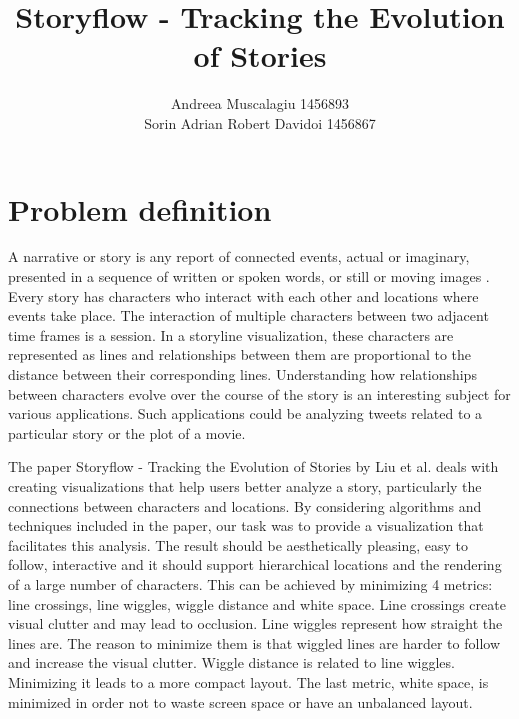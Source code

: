 \documentclass{report}
\begin{document}
\title{Storyflow - Tracking the Evolution of Stories}
\author{Andreea Muscalagiu 1456893\\
Sorin Adrian Robert Davidoi		1456867}
\maketitle
\chapter{Problem definition}
\par
A narrative or story is any report of connected events, actual or imaginary, presented in a sequence of written or spoken words, or still or moving images \cite{Narrative}. Every story has characters who interact with each other and locations where events take place. The interaction of multiple characters between two adjacent time frames is a session. In a storyline visualization, these characters are represented as lines and relationships between them are proportional to the distance between their corresponding lines. Understanding how relationships between characters evolve over the course of the story is an interesting subject for various applications. Such applications could be analyzing tweets related to a particular story or the plot of a movie.

\par The paper Storyflow - Tracking the Evolution of Stories by Liu et al. deals with creating visualizations that help users better analyze a story, particularly the connections between characters and locations. By considering algorithms and techniques included in the paper, our task was to provide a visualization that facilitates this analysis. The result should be aesthetically pleasing, easy to follow, interactive and it should support hierarchical locations and the rendering of a large number of characters. This can be achieved by minimizing 4 metrics: line crossings, line wiggles, wiggle distance and white space. Line crossings create visual clutter and may lead to occlusion. Line wiggles represent how straight the lines are. The reason to minimize them is that wiggled lines are harder to follow and increase the visual clutter. Wiggle distance is related to line wiggles. Minimizing it leads to a more compact layout. The last metric, white space, is minimized in order not to waste screen space or have an unbalanced layout.
\end{document}
